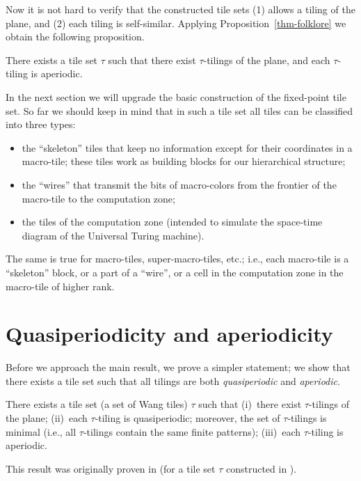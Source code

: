 \documentclass[runningheads]{llncs}
\begin{document}
Now it is not hard to verify that the constructed tile sets (1) allows a tiling of the plane, and (2) each tiling is self-similar. Applying Proposition~\ref{thm-folklore} we obtain the following proposition.
\begin{proposition}[R.~Berger]
There exists a tile set $\tau$ such that 
there exist $\tau$-tilings of the plane, and each $\tau$-tiling is  aperiodic.
\end{proposition}
 In the next section we will upgrade the basic construction of the fixed-point tile set. So far we should keep in mind that in such a tile set all tiles can be classified into three types:
 \begin{itemize}
 \item the ``skeleton'' tiles that keep no information except for their coordinates in a macro-tile; these tiles work as building blocks for our hierarchical structure;
 \item the ``wires'' that transmit the bits of macro-colors from the frontier of the macro-tile to the computation zone;
 \item the tiles of the computation zone (intended to simulate the space-time diagram of the Universal Turing machine). 
 \end{itemize}
 The same is true for macro-tiles, super-macro-tiles, etc.; i.e., each macro-tile is a  ``skeleton'' block, or a part of a ``wire'', or a cell in the computation zone in the macro-tile of higher rank.

 \section{Quasiperiodicity and aperiodicity}

Before we approach the main result, we prove a simpler statement; we show that there exists a tile set such that all tilings are both
\emph{quasiperiodic} and \emph{aperiodic}.
\begin{theorem}\label{thm2}
There exists a tile set \textup(a set of Wang tiles\textup) $\tau$ such that 
(i)~there exist $\tau$-tilings of the plane;
(ii)~each $\tau$-tiling is quasiperiodic; moreover, the set of $\tau$-tilings is minimal \textup(i.e., all $\tau$-tilings contain the same finite patterns\textup);
(iii)~each $\tau$-tiling is  aperiodic.

\end{theorem}
This result was originally proven in \cite{alexis} (for a tile set $\tau$ constructed in \cite{ollinger}). 
\end{document}
